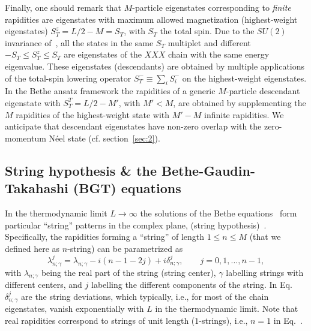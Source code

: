 \documentclass[11pt]{iopart}
\begin{document}
Finally, one should remark that $M$-particle eigenstates corresponding to 
{\it finite} rapidities are eigenstates with maximum allowed magnetization 
(highest-weight eigenstates) $S_T^z=L/2-M=S_T$, with $S_T$ the total spin. 
Due to the $SU(2)$ invariance of~, all the states in the same 
$S_T$ multiplet and different $-S_T\le S_T^z\le S_T$ are eigenstates of the 
$XXX$ chain with the same energy eigenvalue. These eigenstates (descendants) 
are obtained by multiple applications of the total-spin lowering operator 
$S_T^-\equiv\sum_iS_i^-$ on the highest-weight eigenstates. In the Bethe ansatz 
framework the rapidities of a generic $M$-particle descendant eigenstate with 
$S_T^T=L/2-M'$, with $M'<M$, are obtained by supplementing the $M$ rapidities 
of the highest-weight state with $M'-M$  infinite rapidities. We anticipate 
that descendant eigenstates have non-zero overlap with the zero-momentum 
N\'eel state (cf. section~\ref{sec:2}). 
 

\subsection{String hypothesis \& the Bethe-Gaudin-Takahashi (BGT) equations}
\label{sec:1.3}

In the thermodynamic limit $L\to\infty$ the solutions of the Bethe 
equations~ form particular ``string'' patterns in the complex plane, 
(string hypothesis)~\cite{bethe-1931,taka-book}. Specifically, the rapidities 
forming a ``string'' of length $1\le n\le M$ (that we defined here as 
$n$-string) can be parametrized as 
%
\begin{equation}
\label{str-hyp}
\lambda^{j}_{n;\gamma}=\lambda_{n;\gamma}-i(n-1-2j)+i\delta_{n;\gamma}^j,\qquad 
j=0,1,\dots, n-1, 
\end{equation}
%
with $\lambda_{n;\gamma}$ being the real part of the string (string center), 
$\gamma$ labelling strings with different centers, and $j$ labelling the different 
components of the string. In Eq.~ $\delta_{n;\gamma}^j$ are the string 
deviations, which typically, i.e., for most of the chain eigenstates, vanish 
exponentially with $L$ in the thermodynamic limit. 
Note that real rapidities correspond to strings of unit length ($1$-strings), i.e., 
$n=1$ in Eq.~. 
\end{document}
